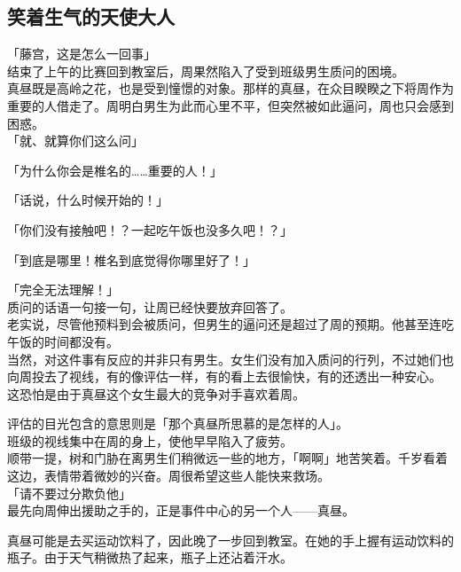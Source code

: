 \subsection{笑着生气的天使大人}

「藤宫，这是怎么一回事」\\

结束了上午的比赛回到教室后，周果然陷入了受到班级男生质问的困境。\\

真昼既是高岭之花，也是受到憧憬的对象。那样的真昼，在众目睽睽之下将周作为重要的人借走了。周明白男生为此而心里不平，但突然被如此逼问，周也只会感到困惑。\\

「就、就算你们这么问」

「为什么你会是椎名的……重要的人！」

「话说，什么时候开始的！」

「你们没有接触吧！？一起吃午饭也没多久吧！？」

「到底是哪里！椎名到底觉得你哪里好了！」

「完全无法理解！」\\

质问的话语一句接一句，让周已经快要放弃回答了。\\

老实说，尽管他预料到会被质问，但男生的逼问还是超过了周的预期。他甚至连吃午饭的时间都没有。\\

当然，对这件事有反应的并非只有男生。女生们没有加入质问的行列，不过她们也向周投去了视线，有的像评估一样，有的看上去很愉快，有的还透出一种安心。\\

这恐怕是由于真昼这个女生最大的竞争对手喜欢着周。

评估的目光包含的意思则是「那个真昼所思慕的是怎样的人」。\\

班级的视线集中在周的身上，使他早早陷入了疲劳。\\

顺带一提，树和门胁在离男生们稍微远一些的地方，「啊啊」地苦笑着。千岁看着这边，表情带着微妙的兴奋。周很希望这些人能快来救场。\\

「请不要过分欺负他」\\

最先向周伸出援助之手的，正是事件中心的另一个人——真昼。

真昼可能是去买运动饮料了，因此晚了一步回到教室。在她的手上握有运动饮料的瓶子。由于天气稍微热了起来，瓶子上还沾着汗水。\\

